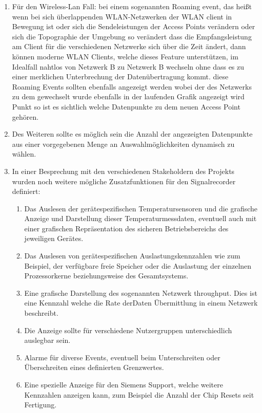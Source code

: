 \begin{enumerate}
        \item  Für den Wireless-Lan Fall:  bei einem sogenannten Roaming event, das heißt wenn bei sich überlappenden WLAN-Netzwerken der WLAN client in Bewegung ist oder sich die Sendeleistungen der Access Points verändern oder sich die Topographie der Umgebung so verändert dass die Empfangsleistung am Client für die verschiedenen Netzwerke sich über die Zeit ändert, dann  können moderne WLAN Clients, welche dieses Feature unterstützen, im Idealfall nahtlos von Netzwerk B zu Netzwerk B wechseln ohne dass es zu einer merklichen Unterbrechung der Datenübertragung kommt. diese Roaming Events sollten ebenfalls angezeigt werden wobei der    des Netzwerks zu dem gewechselt wurde ebenfalls in der laufenden Grafik angezeigt wird Punkt so ist es sichtlich welche Datenpunkte zu dem neuen Access Point gehören.
        \item Des Weiteren sollte es möglich sein die Anzahl der angezeigten Datenpunkte aus einer vorgegebenen Menge an Auswahlmöglichkeiten dynamisch zu wählen.
        \item In einer Besprechung mit den verschiedenen Stakeholdern des Projekts wurden noch weitere  mögliche Zusatzfunktionen für den Signalrecorder definiert: 
                \begin{enumerate}
                        \item  Das Auslesen der gerätespezifischen Temperatursensoren und die  grafische Anzeige und Darstellung dieser Temperaturmessdaten, eventuell auch mit einer grafischen Repräsentation des sicheren Betriebsbereichs des jeweiligen Gerätes.
                        \item Das Auslesen von gerätespezifischen  Auslastungskennzahlen wie zum Beispiel,  der verfügbare freie Speicher oder die Auslastung der einzelnen Prozessorkerne beziehungsweise des Gesamtsystems.
                        \item Eine grafische Darstellung des sogenannten Netzwerk throughput. Dies ist eine Kennzahl welche die Rate derDaten Übermittlung in einem Netzwerk beschreibt. 
                        \item Die Anzeige sollte für verschiedene Nutzergruppen unterschiedlich auslegbar sein.
                        \item Alarme für diverse Events, eventuell beim Unterschreiten oder Überschreiten eines definierten Grenzwertes.
                        \item Eine spezielle Anzeige für den Siemens Support, welche weitere Kennzahlen anzeigen kann, zum Beispiel die Anzahl der Chip Resets seit Fertigung.

\end{enumerate}
\end{enumerate}
